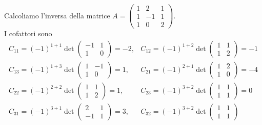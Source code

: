 \begin{esempio}
  Calcoliamo l'inversa della matrice $A=
  \begin{pmatrix}
    1 & 2 &1\\
    1 & -1 & 1\\
    1 & 0 &2
  \end{pmatrix}
  $.\\
  I cofattori sono
  \begin{eqnarray*}
    C_{11}=(-1)^{1+1}\det
    \begin{pmatrix}
      -1 & 1 \\
      1 & 0
    \end{pmatrix}
    =-2, & C_{12}=(-1)^{1+2}\det
                            \begin{pmatrix}
                              1 & 1 \\
                              1 &2
                            \end{pmatrix}=-1\\
     C_{13}=(-1)^{1+3}\det
    \begin{pmatrix}
      1 & -1 \\
      1 & 0
    \end{pmatrix}
    =1, & C_{21}=(-1)^{2+1}\det
                            \begin{pmatrix}
                              1 & 2 \\
                              1 &0
                            \end{pmatrix}=-4\\
    C_{22}=(-1)^{2+2}\det
    \begin{pmatrix}
      1 & 1 \\
      1 & 2
    \end{pmatrix}
    =1, & C_{23}=(-1)^{3+2}\det
                            \begin{pmatrix}
                              1 & 1 \\
                              1 &1
                            \end{pmatrix}=0\\
    C_{31}=(-1)^{3+1}\det
    \begin{pmatrix}
      2 & 1 \\
      -1 & 1
    \end{pmatrix}
    =3, & C_{32}=(-1)^{3+2}\det
                            \begin{pmatrix}
                              1 & 1 \\
                              1 &1

\end{pmatrix}
\end{eqnarray*}
\end{esempio}
